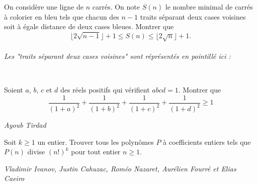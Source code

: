 \begin{exo}{}On considère une ligne de $n$ carrés. On note $S(n)$ le nombre minimal de carrés à colorier en bleu
tels que chacun des $n-1$ traits séparant deux cases voisines soit à égale distance de deux cases
bleues. Montrer que
$$ \lfloor 2 \sqrt {n-1} \rfloor+1 \leq S(n) \leq  \lfloor 2 \sqrt {n} \rfloor +1.$$
~~\\
\textit{Les "traits séparant deux cases voisines" sont réprésentés en pointillé ici :  }
\\

\end{exo}


\begin{exo}{}
Soient $a$, $b$, $c$ et $d$ des réels positifs qui vérifient  $abcd=1$. Montrer que
$$ \dfrac{1}{(1+a)^2}  + \dfrac{1}{(1+b)^2}  + \dfrac{1}{(1+c)^2}  + \dfrac{1}{(1+d)^2} \geq 1$$

\medskip
\textit{Ayoub Tirdad}
\end{exo}

\begin{exo}{}Soit $k \geq 1$ un entier. Trouver tous les polynômes $P$ à coefficients entiers tels que $P(n)$ divise $(n!)^{k}$ pour tout entier $n \geq 1$.

\medskip
\textit{Vladimir Ivanov, Justin Cahuzac, Roméo Nazaret, Aurélien Fourré et Elias Caeiro}
\end{exo}




